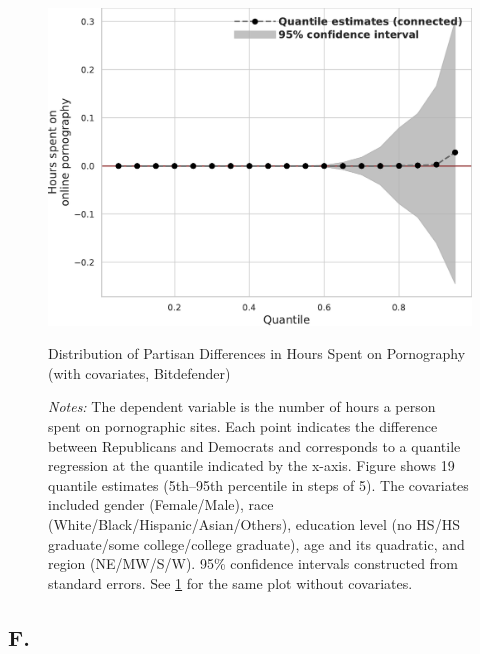 \documentclass[12pt,twoside]{article}
\begin{document}
\begin{figure}[ht]
	\centering
	\includegraphics[width=.6\linewidth]{figs/alphamountain_quantile_reg_covariates_duration_adult.pdf}
	\caption{Distribution of Partisan Differences in Hours Spent on Pornography (with covariates, Bitdefender)}
	\caption*{\footnotesize \emph{Notes:} 
		The dependent variable is the number of hours a person spent on pornographic sites. Each point indicates the difference between Republicans and Democrats and corresponds to a quantile regression at the quantile indicated by the x-axis. Figure shows 19 quantile estimates (5th--95th percentile in steps of 5). The covariates included gender (Female/Male), race (White/Black/Hispanic/Asian/Others), education level (no HS/HS graduate/some college/college graduate), age and its quadratic, and region (NE/MW/S/W). 95\% confidence intervals constructed from standard errors. See \cref{fig:alphamountain_quantile_regression_duration_covariates} for the same plot without covariates.
	}
	\label{fig:alphamountain_quantile_regression_duration_covariates}
\end{figure}


\clearpage
\setcounter{table}{0}
\setcounter{figure}{0}
\setcounter{equation}{0}
\FloatBarrier
\renewcommand{\thetable}{F\arabic{table}}
\renewcommand{\thefigure}{F\arabic{figure}}
\renewcommand{\theequation}{F\arabic{equation}}
\subsection{F. \smFTitle{}}\label{sm:smF}
\end{document}
